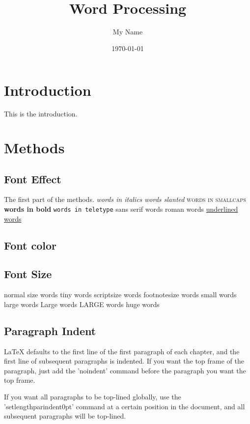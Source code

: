 \documentclass[a4paper,12pt]{article}
\begin{document}
\title{Word Processing}
\author{My Name}
\date{\today}
\maketitle

\section{Introduction}
This is the introduction.

\section{Methods}

\subsection{Font Effect}
\label{sec1}
The first part of the methods.
\textit{words in italics}
\textsl{words slanted}
\textsc{words in smallcaps}
\textbf{words in bold}
\texttt{words in teletype}
\textsf{sans serif words}
\textrm{roman words}
\underline{underlined words}

\subsection{Font color}
{\color{red}{22}}
{\color{magenta}{speak now}}
{\color{cyan}{1989}}


\subsection{Font Size}
normal size words
{\tiny tiny words}
{\scriptsize scriptsize words}
{\footnotesize footnotesize words}
{\small small words}
{\large large words}
{\Large Large words}
{\LARGE LARGE words}
{\huge huge words}

\subsection{Paragraph Indent}
LaTeX defaults to the first line of the first paragraph of each chapter, and the first line of subsequent paragraphs is indented. If you want the top frame of the paragraph, just add the 'noindent' command before the paragraph you want the top frame. \par
\setlength{\parindent}{0pt}
If you want all paragraphs to be top-lined globally, use the 'setlength{parindent}{0pt}' command at a certain position in the document, and all subsequent paragraphs will be top-lined.
\end{document}
